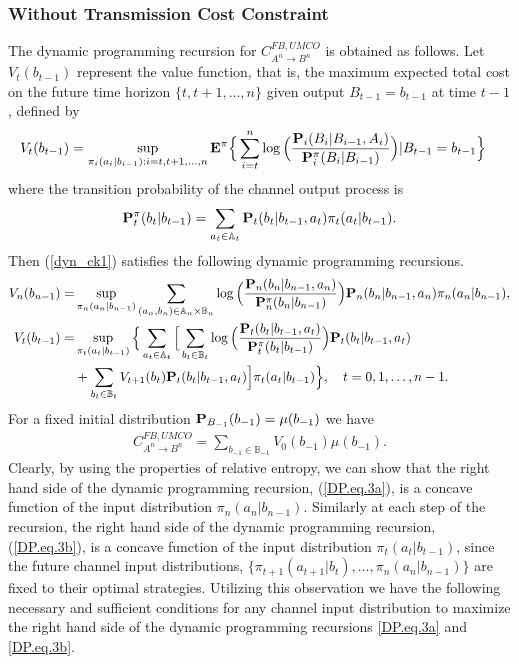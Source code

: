 \documentclass[11pt, a4paper, journal,onecolumn]{IEEEtran}
\newcommand{\mb}{\mathbb}
\newcommand{\rar}{\rightarrow}
\newcommand{\bea}{\begin{eqnarray}}
\newcommand{\eea}{\end{eqnarray}}
\begin{document}
\subsubsection{Without Transmission Cost Constraint}
The dynamic programming recursion for $C_{A^n \rar B^n}^{FB,UMCO}$ is obtained as follows.  Let $V_t(b_{t-1})$ represent the value function, that is, the maximum expected total cost on the future time horizon $\{t,t+1,\dots,n\}$ given output $B_{t-1}=b_{t-1}$ at time $t-1$, defined by
\begin{align}
V_t(b_{t-1})&=\sup_{\pi_i(a_i|b_{i-1}):i=t,t+1, \dots,n}{\bf E}^\pi\Big\{\sum_{i=t}^{n}\log\Big(\frac{{\bf P}_i(B_i|B_{i-1},A_i)}{{\bf P}_i^\pi(B_i|B_{i-1})}\Big)|B_{t-1}=b_{t-1}\Big\}\label{dyn_ck1}
\end{align}
where the  transition probability of the channel output process is 
\begin{equation}
{\bf P}_t^\pi(b_t|b_{t-1})=\sum_{a_t \in {\mb A}_t}{\bf P}_t(b_t|b_{t-1},a_t)\pi_t(a_t|b_{t-1}). \label{T_P_1}
\end{equation}
Then  (\ref{dyn_ck1}) satisfies the following dynamic programming recursions.
\begin{align}
V_n(b_{n-1})=&\sup_{\pi_n(a_n|b_{n-1})}\sum_{(a_n, b_n) \in {\mb A}_n \times {\mb B}_n}   \log\Big(\frac{{\bf P}_n(b_n|b_{n-1},a_n)}{{\bf P}_n^\pi(b_n|b_{n-1})}\Big){\bf P}_n(b_n|b_{n-1},a_n)\pi_n(a_n|b_{n-1}), \label{DP.eq.3a}\\
V_t(b_{t-1})=&\sup_{\pi_t(a_t|b_{t-1})}\Big\{  \sum_{a_t \in {\mb A}_t} \Big[ \sum_{b_t \in {\mb B}_t}      \log\Big(\frac{{\bf P}_t(b_t|b_{t-1},a_t)}{{\bf P}_t^\pi(b_t|b_{t-1})}\Big){\bf P}_t(b_t|b_{t-1},a_t) \nonumber \\
& +\sum_{b_t \in {\mb B}_t}V_{t+1}(b_{t}){\bf P}_t(b_t|b_{t-1},a_t)\Big]\pi_t(a_t|b_{t-1})\Big\},\quad t=0,1,\dots,n-1.\label{DP.eq.3b}
\end{align}
For a fixed initial distribution ${\bf P}_{B_{-1}}(b_{-1})=\mu(b_{-1})$ we have
\bea 
C_{A^n \rar B^n}^{FB,UMCO}=\sum_{b_{-1} \in {\mb B}_{-1} } V_0(b_{-1})\mu(b_{-1}).\label{conn_val_fu}
\eea
Clearly, by using the properties of relative entropy, we can show that the right hand side of the dynamic programming recursion, (\ref{DP.eq.3a}), is a concave function of the input distribution $\pi_n(a_n|b_{n-1})$. Similarly at each step of the recursion, the right hand side of the dynamic programming recursion, (\ref{DP.eq.3b}), is a concave function of the input distribution $\pi_t(a_t|b_{t-1})$, since the future channel input distributions, $\{\pi_{t+1}(a_{t+1}|b_{t}),\ldots,\pi_n(a_n|b_{n-1})\}$ are fixed to their optimal strategies. Utilizing this observation we have the following necessary and sufficient conditions for any channel input distribution to maximize the right hand side of the dynamic programming recursions \eqref{DP.eq.3a} and \eqref{DP.eq.3b}.\\
\end{document}
